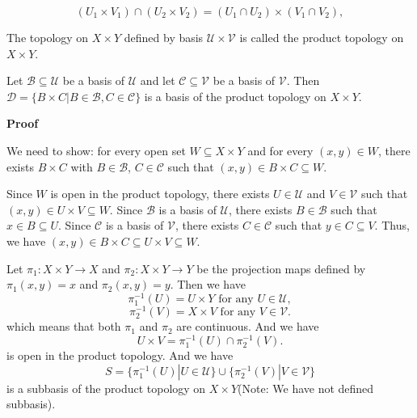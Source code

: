 \documentclass[main.tex]{subfiles}
\begin{document}
\begin{equation}
    (U_1 \times V_1) \cap (U_2 \times V_2) = (U_1 \cap U_2) \times (V_1 \cap V_2),
\end{equation}
\begin{definition}
    The topology on $X\times Y$ defined by basis $\mathcal{U}\times \mathcal{V}$ is called the product topology on $X\times Y$. 
\end{definition}
\begin{theorem}
    Let $\mathcal{B} \subseteq \mathcal{U}$ be a basis of $\mathcal{U}$ and let $\mathcal{C} \subseteq \mathcal{V}$ be a basis of $\mathcal{V}$. Then $\mathcal{D} = \{B \times C | B \in \mathcal{B}, C \in \mathcal{C}\}$ is a basis of the product topology on $X \times Y$.
\end{theorem}

\par \noindent \textbf{Proof} 
\par We need to show: for every open set $W \subseteq X\times Y$ and for every $(x, y) \in W$, there exists $B\times C$ with $B \in \mathcal{B}$, $C \in \mathcal{C}$ such that $(x, y) \in B \times C \subseteq W$.
\par Since $W$ is open in the product topology, there exists $U \in \mathcal{U}$ and $V \in \mathcal{V}$ such that $(x, y) \in U \times V \subseteq W$. Since $\mathcal{B}$ is a basis of $\mathcal{U}$, there exists $B \in \mathcal{B}$ such that $x \in B \subseteq U$. Since $\mathcal{C}$ is a basis of $\mathcal{V}$, there exists $C \in \mathcal{C}$ such that $y \in C \subseteq V$. Thus, we have $(x, y) \in B \times C \subseteq U \times V \subseteq W$.

\begin{example}
    Let $\pi_1: X \times Y \to X$ and $\pi_2: X \times Y \to Y$ be the projection maps defined by $\pi_1(x, y) = x$ and $\pi_2(x, y) = y$. Then we have 
    \begin{equation}
        \pi_1^{-1}(U) = U \times Y \text{ for any } U \in \mathcal{U},
    \end{equation}
    \begin{equation}
        \pi_2^{-1}(V) = X \times V \text{ for any } V \in \mathcal{V}.
    \end{equation}
    which means that both $\pi_1$ and $\pi_2$ are continuous. And we have 
    \begin{equation}
        U\times V = \pi_1^{-1}(U) \cap \pi_2^{-1}(V).
    \end{equation}
    is open in the product topology. And we have 
    \begin{equation}
        S = \{\pi_1^{-1}(U)| U \in \mathcal{U}\} \cup \{\pi_2^{-1}(V) | V \in \mathcal{V}\} 
    \end{equation}
    is a subbasis of the product topology on $X \times Y$(Note: We have not defined subbasis). 
\end{example}
\end{document}
